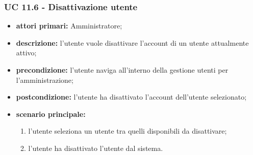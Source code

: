 			
			\subsubsection{UC 11.6 - Disattivazione utente}
			\begin{itemize}
				\item \textbf{attori primari:} Amministratore;
				\item \textbf{descrizione:} l'utente vuole disattivare l'account di un utente attualmente attivo;
				\item \textbf{precondizione:} l'utente naviga all'interno della gestione utenti per l'amministrazione;
				\item \textbf{postcondizione:} l'utente ha disattivato l'account dell'utente selezionato;
				\item \textbf{scenario principale:}
				\begin{enumerate}
					\item{l'utente seleziona un utente tra quelli disponibili da disattivare;}
					\item{l'utente ha disattivato l'utente dal sistema.}
				\end{enumerate}		
			\end{itemize}

			
			